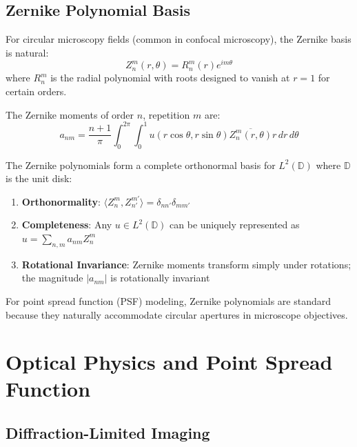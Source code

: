 \documentclass[twocolumn,11pt]{article}
\begin{document}
\subsection{Zernike Polynomial Basis}

For circular microscopy fields (common in confocal microscopy), the Zernike basis is natural:
\begin{equation}
Z_n^m(r, \theta) = R_n^m(r) e^{im\theta}
\end{equation}
where $R_n^m$ is the radial polynomial with roots designed to vanish at $r=1$ for certain orders.

\begin{definition}
The Zernike moments of order $n$, repetition $m$ are:
\begin{equation}
a_{nm} = \frac{n+1}{\pi} \int_0^{2\pi} \int_0^1 u(r\cos\theta, r\sin\theta) \overline{Z_n^m(r,\theta)} r \, dr \, d\theta
\end{equation}
\end{definition}

\begin{theorem}
The Zernike polynomials form a complete orthonormal basis for $L^2(\mathbb{D})$ where $\mathbb{D}$ is the unit disk:
\begin{enumerate}
\item \textbf{Orthonormality}: $\langle Z_n^m, Z_{n'}^{m'} \rangle = \delta_{nn'} \delta_{mm'}$
\item \textbf{Completeness}: Any $u \in L^2(\mathbb{D})$ can be uniquely represented as $u = \sum_{n,m} a_{nm} Z_n^m$
\item \textbf{Rotational Invariance}: Zernike moments transform simply under rotations; the magnitude $|a_{nm}|$ is rotationally invariant
\end{enumerate}
\end{theorem}

For point spread function (PSF) modeling, Zernike polynomials are standard because they naturally accommodate circular apertures in microscope objectives.

\section{Optical Physics and Point Spread Function}

\subsection{Diffraction-Limited Imaging}
\end{document}
